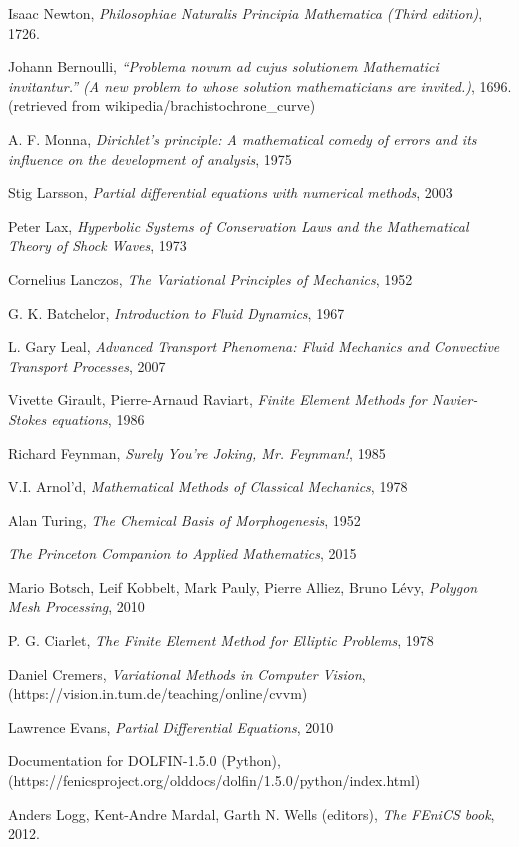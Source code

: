 \documentclass[11pt,a4paper]{memoir}
\begin{document}
\begin{thebibliography}{9}

Isaac Newton, \textit{Philosophiae Naturalis Principia Mathematica (Third edition)}, 1726.

Johann Bernoulli, \textit{``Problema novum ad cujus solutionem Mathematici invitantur.'' (A new problem to whose solution mathematicians are invited.)}, 1696.
(retrieved from wikipedia/brachistochrone\_curve)

A. F. Monna, \textit{Dirichlet's principle: A mathematical comedy of errors and its influence on the development of analysis}, 1975

Stig Larsson, \textit{Partial differential equations with numerical methods}, 2003

Peter Lax, \textit{Hyperbolic Systems of Conservation Laws and the Mathematical Theory of Shock Waves}, 1973

Cornelius Lanczos, \textit{The Variational Principles of Mechanics}, 1952

G. K. Batchelor, \textit{Introduction to Fluid Dynamics}, 1967

L. Gary Leal, \textit{Advanced Transport Phenomena: Fluid Mechanics and Convective Transport Processes}, 2007

Vivette Girault, Pierre-Arnaud Raviart, \textit{Finite Element Methods for Navier-Stokes equations}, 1986

Richard Feynman, \textit{Surely You're Joking, Mr. Feynman!}, 1985

V.I. Arnol'd, \textit{Mathematical Methods of Classical Mechanics}, 1978

Alan Turing, \textit{The Chemical Basis of Morphogenesis}, 1952

\textit{The Princeton Companion to Applied Mathematics}, 2015

Mario Botsch, Leif Kobbelt, Mark Pauly, Pierre Alliez, Bruno L\'evy, \textit{Polygon Mesh Processing}, 2010

P. G. Ciarlet, \textit{The Finite Element Method for Elliptic Problems}, 1978

Daniel Cremers, \textit{Variational Methods in Computer Vision},\\(https://vision.in.tum.de/teaching/online/cvvm)

Lawrence Evans, \textit{Partial Differential Equations}, 2010

Documentation for DOLFIN-1.5.0 (Python),\\
(https://fenicsproject.org/olddocs/dolfin/1.5.0/python/index.html)

Anders Logg, Kent-Andre Mardal, Garth N. Wells (editors), \textit{The FEniCS book}, 2012.


\end{thebibliography}
\end{document}
